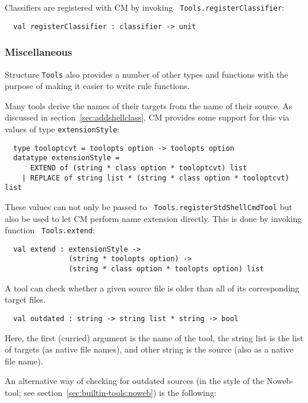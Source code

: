 Classifiers are registered with CM by invoking {\tt
Tools.registerClassifier}:

\begin{verbatim}
  val registerClassifier : classifier -> unit
\end{verbatim}

\subsubsection{Miscellaneous}

Structure {\tt Tools} also provides a number of other types and
functions with the purpose of making it easier to write rule
functions.

 Many tools derive the names of
their targets from the name of their source.  As discussed in
section~\ref{sec:addshellclass}, CM provides some support for this via
values of type {\tt extensionStyle}:

\begin{verbatim}
  type tooloptcvt = toolopts option -> toolopts option
  datatype extensionStyle =
      EXTEND of (string * class option * tooloptcvt) list
    | REPLACE of string list * (string * class option * tooloptcvt) list
\end{verbatim}

These values can not only be passed to {\tt
Tools.registerStdShellCmdTool} but also be used to let CM perform name
extension directly.  This is done by invoking function {\tt
Tools.extend}:

\begin{verbatim}
  val extend : extensionStyle ->
               (string * toolopts option) ->
               (string * class option * toolopts option) list
\end{verbatim}

 A tool can check whether a given
source file is older than all of its corresponding target files.

\begin{verbatim}
  val outdated : string -> string list * string -> bool
\end{verbatim}

Here, the first (curried) argument is the name of the tool, the string
list is the list of targets (as native file names), and other string
is the source (also as a native file name).

An alternative way of checking for outdated sources (in the style of
the Noweb-tool; see section~\ref{sec:builtin-tools:noweb}) is the
following:

